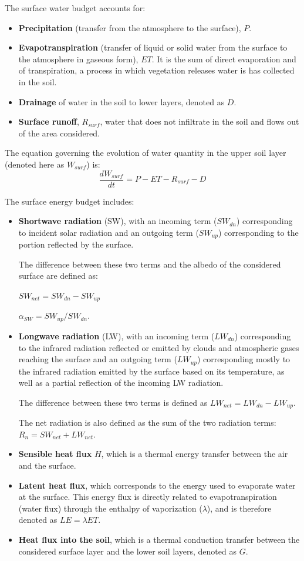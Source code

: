 The surface water budget accounts for:
\begin{itemize}
    \item \textbf{Precipitation} (transfer from the atmosphere to the surface), $P$.
    \item \textbf{Evapotranspiration} (transfer of liquid or solid water from the surface to the atmosphere in gaseous form), $ET$. It is the sum of direct evaporation and of transpiration, a process in  which vegetation releases water is has collected in the soil.
    \item \textbf{Drainage} of water in the soil to lower layers, denoted  as $D$. 
    \item \textbf{Surface runoff}, $R_{surf}$, water that does not infiltrate in the soil and flows out of the area considered.
\end{itemize}

The equation governing the evolution of water quantity in the upper soil layer (denoted here as $W_{surf}$) is:
\begin{equation}
    \frac{dW_{surf}}{dt} = P - ET - R_{surf} - D
\end{equation}

\hfill

The surface energy budget includes:
\begin{itemize}
    \item \textbf{Shortwave radiation} (SW), with an incoming term ($SW_{dn}$) corresponding to incident solar radiation and an outgoing term ($SW_{up}$) corresponding to the portion reflected by the surface.

    The difference between these two terms and the albedo of the considered surface are defined as:

    $SW_{net} = SW_{dn} - SW_{up}$

    $\alpha_{SW} = SW_{up}/SW_{dn}$.
    \item \textbf{Longwave radiation} (LW), with an incoming term ($LW_{dn}$) corresponding to the infrared radiation reflected or emitted by clouds and atmospheric gases reaching the surface and an outgoing term ($LW_{up}$) corresponding mostly to the infrared radiation emitted by the surface based on its temperature, as well as a partial reflection of the incoming LW radiation.

    The difference between these two terms is defined as $LW_{net} = LW_{dn} - LW_{up}$.
    
    The net radiation is also defined as the sum of the two radiation terms: $R_{n} = SW_{net} + LW_{net}$.
    \item \textbf{Sensible heat flux} $H$, which is a thermal energy transfer between the air and the surface.
    \item \textbf{Latent heat flux}, which corresponds to the energy used to evaporate water at the surface. This energy flux is directly related to evapotranspiration (water flux) through the enthalpy of vaporization ($\lambda$), and is therefore denoted as $LE = \lambda ET$.
    \item \textbf{Heat flux into the soil}, which is a thermal conduction transfer between the considered surface layer and the lower soil layers, denoted as $G$.
\end{itemize}

